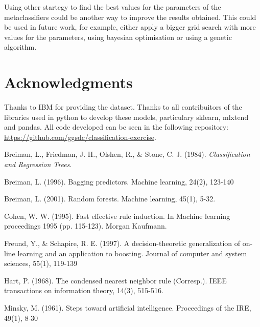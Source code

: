 \documentclass[a4paper,11pt]{article}
\begin{document}
Using other startegy to find the best values for the parameters of the metaclassifiers could be another way to improve the results obtained. This could be used in future work, for example, either apply a bigger grid search with more values for the parameters, using bayesian optimisation or using a genetic algorithm.



\section{Acknowledgments}

Thanks to IBM for providing the dataset.
Thanks to all contribuitors of the libraries used in python to develop these models, particulary sklearn, mlxtend and pandas.
All code developed can be seen in the following repository: \url{https://github.com/ggsdc/classification-exercise}.



\begin{thebibliography}{}

Breiman, L., Friedman, J. H., Olshen, R., \& Stone, C. J. (1984). \textit{Classification and Regression Trees}.

Breiman, L. (1996). Bagging predictors. Machine learning, 24(2), 123-140

Breiman, L. (2001). Random forests. Machine learning, 45(1), 5-32.

Cohen, W. W. (1995). Fast effective rule induction. In Machine learning proceedings 1995 (pp. 115-123). Morgan Kaufmann.

Freund, Y., \& Schapire, R. E. (1997). A decision-theoretic generalization of on-line learning and an application to boosting. Journal of computer and system sciences, 55(1), 119-139

Hart, P. (1968). The condensed nearest neighbor rule (Corresp.). IEEE transactions on information theory, 14(3), 515-516.

Minsky, M. (1961). Steps toward artificial intelligence. Proceedings of the IRE, 49(1), 8-30


\end{thebibliography}
\end{document}
